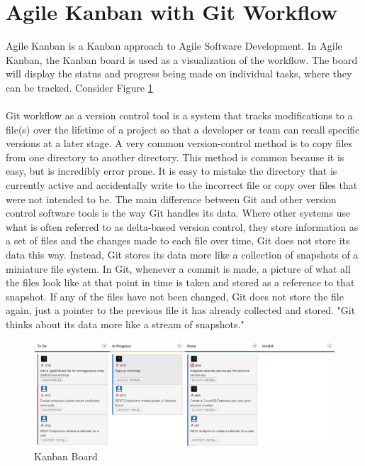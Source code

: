 \section{Agile Kanban with Git Workflow}
Agile Kanban is a Kanban approach to Agile Software Development. In Agile Kanban, the Kanban board is used as a visualization of the workflow. The board will display the status and progress being made on individual tasks, where they can be tracked. Consider Figure \ref{fig:kanban}

\paragraph{}
Git workflow as a version control tool is a system that tracks modifications to a file(s) over the lifetime of a project so that a developer or team can recall specific versions at a later stage. A very common version-control method is to copy files from one directory to another directory. This method is common because it is easy, but is incredibly error prone. It is easy to mistake the directory that is currently active and accidentally write to the incorrect file or copy over files that were not intended to be.\cite{chachon} The main difference between Git and other version control software tools is the way Git handles its data. Where other systems use what is often referred to as delta-based version control, they store information as a set of files and the changes made to each file over time, Git does not  store its data this way. Instead, Git stores its data more like a collection of snapshots of a miniature file system. In Git, whenever a commit is made, a picture of what all the files look like at that point in time is taken and stored as a reference to that snapshot.\cite{chachon} If any of the files have not been changed, Git does not store the file again, just a pointer to the previous file it has already collected and stored. "Git thinks about its data more like a stream of snapshots."\cite{chachon}



\begin{figure}
\includegraphics[width=\textwidth]{img/Kanban.PNG}
\caption{Kanban Board}
\label{fig:kanban}
\end{figure}

